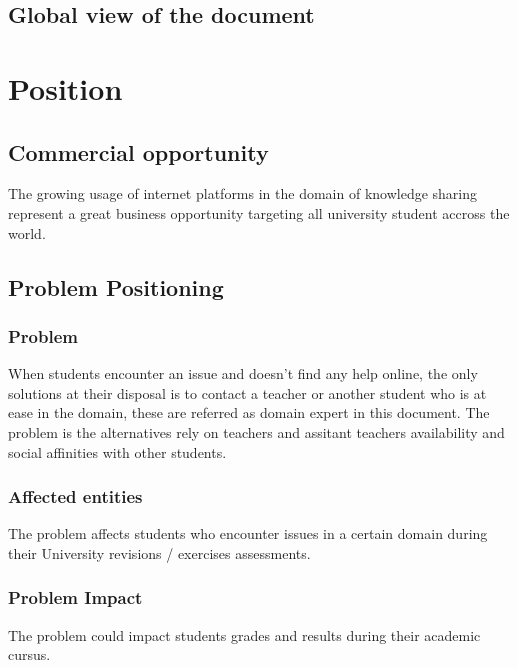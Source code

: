 \documentclass[12pt,a4paper,oneside, titlepage]{article}
\begin{document}
		\subsection{Global view of the document}
		
    \newpage
	\section{Position}		
		
		\subsection{Commercial opportunity}
		    The growing usage of internet platforms in the domain of knowledge sharing
		    represent a great business opportunity targeting all university student accross 
		    the world.
		    
		    
		\subsection{Problem Positioning}
		
         \subsubsection{Problem}
         When students encounter an issue and doesn't find any help online, the only solutions at their disposal
         is to contact a teacher or another student who is at ease in the domain, these are referred as domain 
         expert in this document. The problem is the alternatives rely on teachers and assitant teachers 
         availability and social affinities with other students.
         
         \subsubsection{Affected entities}
         The problem affects students who encounter issues in a certain domain during their University 
         revisions / exercises assessments.
            
         \subsubsection{Problem Impact}
         The problem could impact students grades and results during their academic cursus. 
                  
\end{document}
